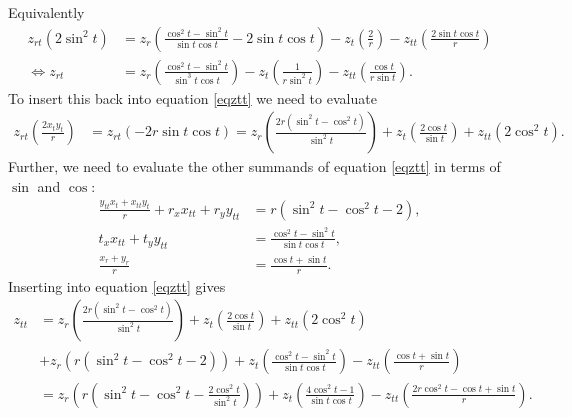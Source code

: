 \documentclass{article}
\begin{document}
Equivalently
\begin{align*}
  z_{rt}(2\sin^2 t) &= z_r\left(\frac{\cos^2 t - \sin^2 t}{\sin t \cos t}-2\sin t\cos t\right)-z_t\left(\frac{2}{r}\right)
  -z_{tt}\left(\frac{2\sin t\cos t}{r}\right)\\
  \Leftrightarrow z_{rt}&=z_r\left(\frac{\cos^2 t - \sin^2 t}{\sin^3 t \cos t}\right)
  -z_t\left(\frac{1}{r\sin^2 t}\right)-z_{tt}\left(\frac{\cos t}{r\sin t}\right).
\end{align*}
To insert this back into equation \ref{eqztt} we need to evaluate
\begin{align*}
  z_{rt}\left(\frac{2x_t y_t}{r}\right)
  &=z_{rt}\left(-2r\sin t\cos t\right)
  =z_r\left(\frac{2r(\sin^2 t - \cos^2 t)}{\sin^2 t}\right)+z_t\left(\frac{2\cos t}{\sin t}\right)+z_{tt}\left(2\cos^2 t\right).
\end{align*}
Further, we need to evaluate the other summands of equation \ref{eqztt} in terms of $\sin$ and $\cos$:
\begin{align*}
  \frac{y_{tt}x_t+x_{tt}y_t}{r}+r_x x_{tt}+r_y y_{tt}&=r(\sin^2 t - \cos^2 t - 2),\\
  t_x x_{tt} + t_y y_{tt}&=\frac{\cos^2 t-\sin^2 t}{\sin t\cos t},\\
  \frac{x_r+y_r}{r}&=\frac{\cos t + \sin t}{r}.
\end{align*}
Inserting into equation \ref{eqztt} gives
\begin{align*}
  z_{tt} &= z_r\left(\frac{2r(\sin^2 t - \cos^2 t)}{\sin^2 t}\right)
  +z_t\left(\frac{2\cos t}{\sin t}\right)+z_{tt}\left(2\cos^2 t\right)\\
  &+z_r\left(r(\sin^2 t - \cos^2 t - 2)\right)+z_t\left(\frac{\cos^2 t-\sin^2 t}{\sin t\cos t}\right)-z_{tt}\left(\frac{\cos t + \sin t}{r}\right) \\
  &=z_r\left(r\left(\sin^2 t - \cos^2 t - \frac{2\cos^2 t}{\sin^2 t}\right)\right)
  +z_t\left(\frac{4\cos^2 t-1}{\sin t\cos t}\right)
  - z_{tt}\left(\frac{2r\cos^2 t - \cos t + \sin t}{r}\right).
\end{align*}
\end{document}
